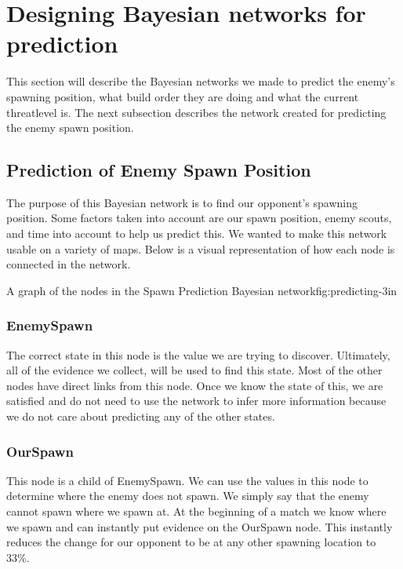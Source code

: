 \section{Designing Bayesian networks for prediction}\label{bayesian_network}
This section will describe the Bayesian networks we made to predict the enemy's spawning position, what build order they are doing and what the current 
threatlevel is. The next subsection describes the network created for predicting the enemy spawn position.

\subsection{Prediction of Enemy Spawn Position}			 
			
The purpose of this Bayesian network is to find our opponent's spawning position. Some factors taken into account are our spawn position, enemy scouts, and time into account to help us predict this. We wanted to make this network usable on a variety of maps. Below is a visual representation of how each node is connected in the network.

			{A graph of the nodes in the Spawn Prediction Bayesian network}{fig:predicting}{-3in}


\subsubsection*{EnemySpawn}
The correct state in this node is the value we are trying to discover. Ultimately, all of the evidence we collect, will be used to find this state. Most of the other nodes have direct links from this node. Once we know the state of this, we are satisfied and do not need to use the network to infer more information because we do not care about predicting any of the other states.

\subsubsection*{OurSpawn}
This node is a child of EnemySpawn. We can use the values in this node to determine where the enemy does not spawn. We simply say that the enemy cannot spawn where we spawn at. At the beginning of a match we know where we spawn and can instantly put evidence on the OurSpawn node. This instantly reduces the change for our opponent to be at any other spawning location to 33\%.

